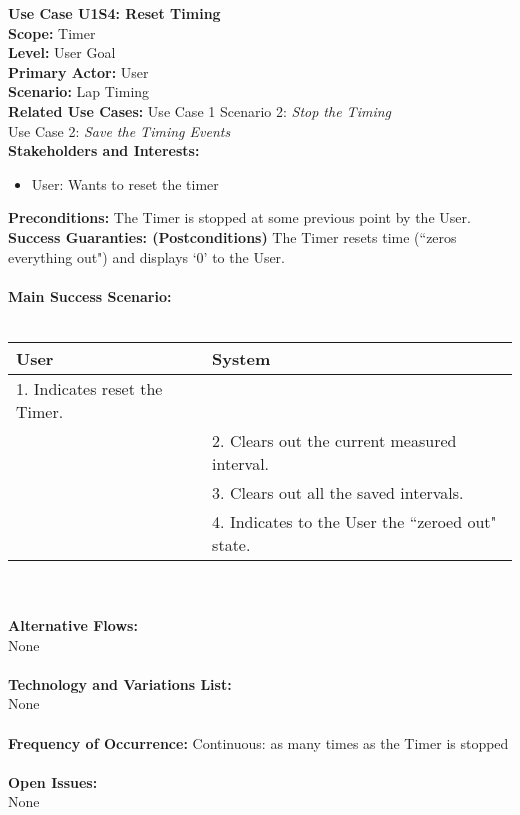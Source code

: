 \documentclass[letterpaper]{article}
\begin{document}
\noindent
\textbf{Use Case U1S4:  Reset Timing}\\
\textbf{Scope:  }Timer\\
\textbf{Level:  }User Goal\\
\textbf{Primary Actor:  }User\\
\textbf{Scenario:  }Lap Timing\\
\textbf{Related Use Cases:  }Use Case 1 Scenario 2:
\textit{Stop the Timing}\\
Use Case 2: \textit{Save the Timing Events}\\
\textbf{Stakeholders and Interests:}
\begin{itemize}
\item User:  Wants to reset the timer
\end{itemize}
\textbf{Preconditions:  }The Timer is stopped at some previous
point by the User.\\
\textbf{Success Guaranties:  (Postconditions)} The Timer resets
time (``zeros everything out") and displays `0' to the User.\\\\
\textbf{Main Success Scenario: }\\\\
\begin{tabular}{|p{6cm}|p{6cm}|}\hline
\textbf{User} & \textbf{System}\\\hline
1.  Indicates reset the Timer. & \\\hline
&2.  Clears out the current measured interval.\\\hline
&3.  Clears out all the saved intervals.\\\hline
&4.  Indicates to the User the ``zeroed out" state.\\\hline
\end{tabular}\\\\
\textbf{Alternative Flows:  }\\
None\\\\
\textbf{Technology and Variations List:  }\\
None\\\\
\textbf{Frequency of Occurrence:  } Continuous:  as many times as the
Timer is stopped\\\\
\textbf{Open Issues:  }\\
None
\end{document}
